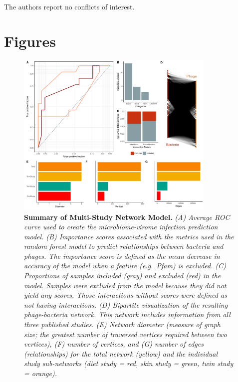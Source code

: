 \documentclass[12pt,]{article}
\begin{document}
The authors report no conflicts of interest.

\newpage

\section{Figures}\label{figures}

\begin{figure}[htbp]
\centering
\includegraphics[width=0.85000\textwidth]{../figures/rocCurves.pdf}
\caption{\textbf{Summary of Multi-Study Network Model.} \emph{(A)
Average ROC curve used to create the microbiome-virome infection
prediction model. (B) Importance scores associated with the metrics used
in the random forest model to predict relationships between bacteria and
phages. The importance score is defined as the mean decrease in accuracy
of the model when a feature (e.g.~Pfam) is excluded. (C) Proportions of
samples included (gray) and excluded (red) in the model. Samples were
excluded from the model because they did not yield any scores. Those
interactions without scores were defined as not having interactions. (D)
Bipartite visualization of the resulting phage-bacteria network. This
network includes information from all three published studies. (E)
Network diameter (measure of graph size; the greatest number of
traversed vertices required between two vertices), (F) number of
vertices, and (G) number of edges (relationships) for the total network
(yellow) and the individual study sub-networks (diet study = red, skin
study = green, twin study = orange).} \label{RocCurve}}
\end{figure}

\newpage
\end{document}
